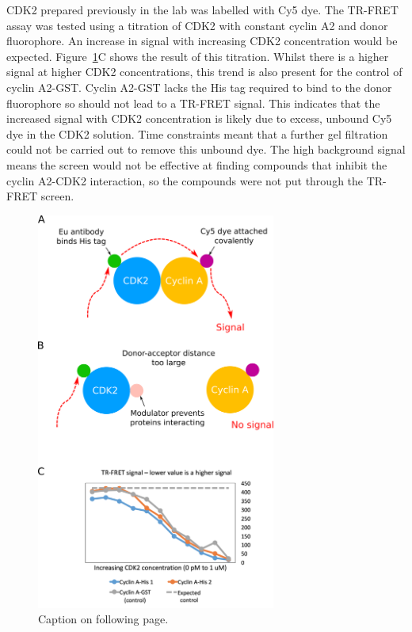 CDK2 prepared previously in the lab was labelled with Cy5 dye.
The TR-FRET assay was tested using a titration of CDK2 with constant cyclin A2 and donor fluorophore.
An increase in signal with increasing CDK2 concentration would be expected.
Figure~\ref{fig:tr_fret}C shows the result of this titration.
Whilst there is a higher signal at higher CDK2 concentrations, this trend is also present for the control of cyclin A2-GST.
Cyclin A2-GST lacks the His tag required to bind to the donor fluorophore so should not lead to a TR-FRET signal.
This indicates that the increased signal with CDK2 concentration is likely due to excess, unbound Cy5 dye in the CDK2 solution.
Time constraints meant that a further gel filtration could not be carried out to remove this unbound dye.
The high background signal means the screen would not be effective at finding compounds that inhibit the cyclin A2-CDK2 interaction, so the compounds were not put through the TR-FRET screen.


\begin{figure}
\centering

\includegraphics[width=0.7\textwidth]{figures/tr_fret/tr_fret}

\caption[TR-FRET assay principles and results]
{Caption on following page.}

\label{fig:tr_fret}
\end{figure}

